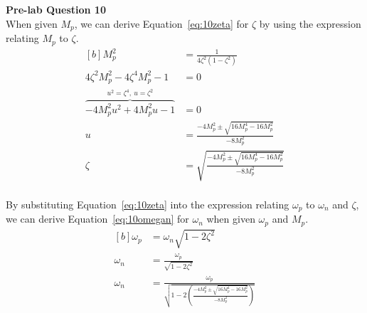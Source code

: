 \documentclass[12pt]{article}
\begin{document}
\clearpage
\textbf{Pre-lab Question 10} \\
When given $M_p$, we can derive Equation~\ref{eq:10zeta} for $\zeta$ by using the expression relating $M_p$ to $\zeta$.
\begin{equation} \label{eq:10zeta}
\begin{aligned}[b]
    M_p^2 &= \frac{1}{4\zeta^2 (1 - \zeta^2)} \\
    4\zeta^2 M_p^2 - 4\zeta^4 M_p^2 - 1 &= 0 \\
    \overbrace{-4 M_p^2 u^2 + 4 M_p^2 u - 1}^{u^2 = \zeta^4, \ u = \zeta^2} &= 0 \\
    u &= \frac{-4 M_p^2 \pm \sqrt{16 M_p^4 - 16 M_p^2}}{-8 M_p^2} \\
    \zeta &= \sqrt{\frac{-4 M_p^2 \pm \sqrt{16 M_p^4 - 16 M_p^2}}{-8 M_p^2}} \\
\end{aligned}
\end{equation}

By substituting Equation~\ref{eq:10zeta} into the expression relating $\omega_p$ to $\omega_n$ and $\zeta$, we can derive Equation~\ref{eq:10omegan} for $\omega_n$ when given $\omega_p$ and $M_p$.
\begin{equation} \label{eq:10omegan}
\begin{aligned}[b]
    \omega_p &= \omega_n \sqrt{1 - 2\zeta^2} \\
    \omega_n &= \frac{\omega_p}{\sqrt{1 - 2\zeta^2}} \\
    \omega_n &= \frac{\omega_p}{\sqrt{1 - 2 \left( \frac{-4 M_p^2 \pm \sqrt{16 M_p^4 - 16 M_p^2}}{-8 M_p^2} \right)}}
\end{aligned}
\end{equation}
\end{document}
